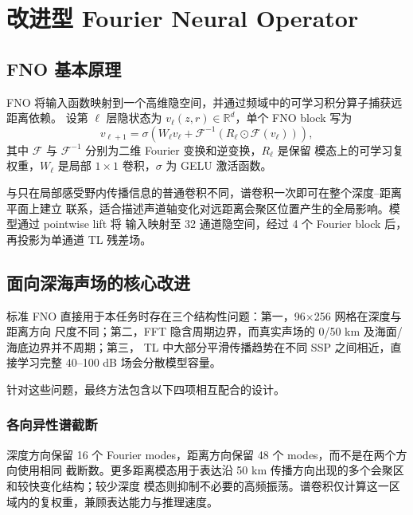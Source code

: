 \documentclass[UTF8,11pt]{ctexart}
\begin{document}
\section{改进型 Fourier Neural Operator}

\subsection{FNO 基本原理}

FNO 将输入函数映射到一个高维隐空间，并通过频域中的可学习积分算子捕获远距离依赖。
设第 $\ell$ 层隐状态为 $v_\ell(z,r)\in\mathbb{R}^{d}$，单个 FNO block 写为
\begin{equation}
  v_{\ell+1}=\sigma\left(W_\ell v_\ell+
  \mathcal{F}^{-1}\!\left(R_\ell\odot\mathcal{F}(v_\ell)\right)\right),
  \label{eq:fno}
\end{equation}
其中 $\mathcal{F}$ 与 $\mathcal{F}^{-1}$ 分别为二维 Fourier 变换和逆变换，$R_\ell$ 是保留
模态上的可学习复权重，$W_\ell$ 是局部 $1\times1$ 卷积，$\sigma$ 为 GELU 激活函数。

与只在局部感受野内传播信息的普通卷积不同，谱卷积一次即可在整个深度--距离平面上建立
联系，适合描述声道轴变化对远距离会聚区位置产生的全局影响。模型通过 pointwise lift 将
输入映射至 32 通道隐空间，经过 4 个 Fourier block 后，再投影为单通道 TL 残差场。

\subsection{面向深海声场的核心改进}

标准 FNO 直接用于本任务时存在三个结构性问题：第一，96$\times$256 网格在深度与距离方向
尺度不同；第二，FFT 隐含周期边界，而真实声场的 0/50 km 及海面/海底边界并不周期；第三，
TL 中大部分平滑传播趋势在不同 SSP 之间相近，直接学习完整 40--100 dB 场会分散模型容量。

针对这些问题，最终方法包含以下四项相互配合的设计。

\subsubsection{各向异性谱截断}

深度方向保留 16 个 Fourier modes，距离方向保留 48 个 modes，而不是在两个方向使用相同
截断数。更多距离模态用于表达沿 50 km 传播方向出现的多个会聚区和较快变化结构；较少深度
模态则抑制不必要的高频振荡。谱卷积仅计算这一区域内的复权重，兼顾表达能力与推理速度。
\end{document}
